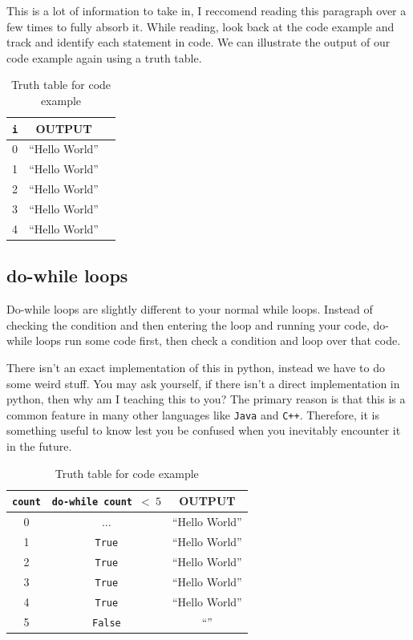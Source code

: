 \documentclass[12pt,a4paper]{book}
\begin{document}
					This is a lot of information to take in, I reccomend reading this paragraph over a few times to fully absorb it. While reading, look back at the code example and track and identify each statement in code. We can illustrate the output of our code example again using a truth table.

					\begin{table}[H]
						\centering
						\begin{tabular}{c|c|c}
							\texttt{i} & OUTPUT \\
							\hline
							0 &  ``Hello World'' \\
							1 &  ``Hello World'' \\
							2 &  ``Hello World'' \\
							3 &  ``Hello World'' \\
							4 &  ``Hello World''
						\end{tabular}
						\caption{Truth table for code example}
						\label{tab:for-def-tt}
					\end{table}

				\subsection{do-while loops}
					Do-while loops are slightly different to your normal while loops. Instead of checking the condition and then entering the loop and running your code, do-while loops run some code first, then check a condition and loop over that code.
					
					There isn't an exact implementation of this in python, instead we have to do some weird stuff. You may ask yourself, if there isn't a direct implementation in python, then why am I teaching this to you? The primary reason is that this is a common feature in many other languages like \texttt{Java} and \texttt{C++}. Therefore, it is something useful to know lest you be confused when you inevitably encounter it in the future.


					\begin{table}[H]
						\centering
						\begin{tabular}{c|c|c}
							\texttt{count} & \texttt{do-while count $< \ 5$} & OUTPUT \\
							\hline
							0 & $\dots$ & ``Hello World'' \\
							1 & \texttt{True} & ``Hello World'' \\
							2 & \texttt{True} & ``Hello World'' \\
							3 & \texttt{True} & ``Hello World'' \\
							4 & \texttt{True} & ``Hello World'' \\
							5 & \texttt{False} & ``''
						\end{tabular}
						\caption{Truth table for code example}
						\label{tab:dowhile-def-tt}
					\end{table}
\end{document}
